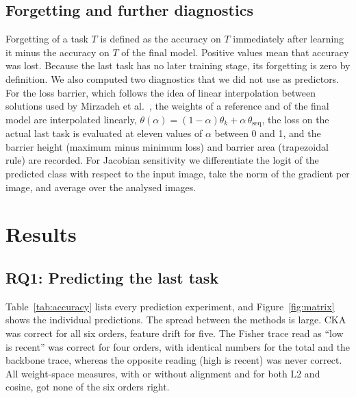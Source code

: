 \documentclass[11pt,a4paper]{article}
\begin{document}
\subsection{Forgetting and further diagnostics}

Forgetting of a task $T$ is defined as the accuracy on $T$ immediately after learning it minus the accuracy on $T$ of the final model. Positive values mean that accuracy was lost. Because the last task has no later training stage, its forgetting is zero by definition. We also computed two diagnostics that we did not use as predictors. For the loss barrier, which follows the idea of linear interpolation between solutions used by Mirzadeh et al.\ \cite{mirzadeh2020}, the weights of a reference and of the final model are interpolated linearly, $\theta(\alpha)=(1-\alpha)\theta_k+\alpha\,\theta_\mathrm{seq}$, the loss on the actual last task is evaluated at eleven values of $\alpha$ between 0 and 1, and the barrier height (maximum minus minimum loss) and barrier area (trapezoidal rule) are recorded. For Jacobian sensitivity we differentiate the logit of the predicted class with respect to the input image, take the norm of the gradient per image, and average over the analysed images.

\section{Results}\label{sec:results}

\subsection{RQ1: Predicting the last task}

Table~\ref{tab:accuracy} lists every prediction experiment, and Figure~\ref{fig:matrix} shows the individual predictions. The spread between the methods is large. CKA was correct for all six orders, feature drift for five. The Fisher trace read as ``low is recent'' was correct for four orders, with identical numbers for the total and the backbone trace, whereas the opposite reading (high is recent) was never correct. All weight-space measures, with or without alignment and for both L2 and cosine, got none of the six orders right.
\end{document}
